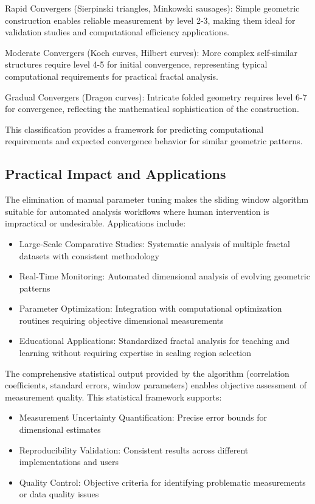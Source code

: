 \documentclass[preprint,12pt]{elsarticle}
\def\textbf#1{#1}%
\begin{document}
\textbf{Rapid Convergers} (Sierpinski triangles, Minkowski sausages): Simple geometric construction enables reliable measurement by level 2-3, making them ideal for validation studies and computational efficiency applications.

\textbf{Moderate Convergers} (Koch curves, Hilbert curves): More complex self-similar structures require level 4-5 for initial convergence, representing typical computational requirements for practical fractal analysis.

\textbf{Gradual Convergers} (Dragon curves): Intricate folded geometry requires level 6-7 for convergence, reflecting the mathematical sophistication of the construction.

This classification provides a framework for predicting computational requirements and expected convergence behavior for similar geometric patterns.

\subsection{Practical Impact and Applications}

The elimination of manual parameter tuning makes the sliding window algorithm suitable for automated analysis workflows where human intervention is impractical or undesirable. Applications include:

\begin{itemize}
\item \textbf{Large-Scale Comparative Studies}: Systematic analysis of multiple fractal datasets with consistent methodology
\item \textbf{Real-Time Monitoring}: Automated dimensional analysis of evolving geometric patterns
\item \textbf{Parameter Optimization}: Integration with computational optimization routines requiring objective dimensional measurements
\item \textbf{Educational Applications}: Standardized fractal analysis for teaching and learning without requiring expertise in scaling region selection
\end{itemize}

The comprehensive statistical output provided by the algorithm (correlation coefficients, standard errors, window parameters) enables objective assessment of measurement quality. This statistical framework supports:

\begin{itemize}
\item \textbf{Measurement Uncertainty Quantification}: Precise error bounds for dimensional estimates
\item \textbf{Reproducibility Validation}: Consistent results across different implementations and users
\item \textbf{Quality Control}: Objective criteria for identifying problematic measurements or data quality issues
\end{itemize}
\end{document}
